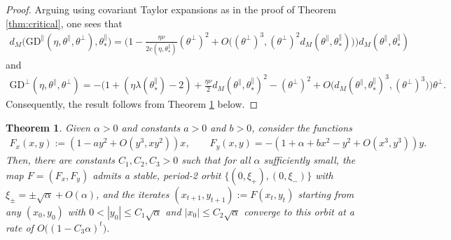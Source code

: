 \documentclass{article}
\newcommand{\tpa}{\theta^{\parallel}}
\newcommand{\tpe}{\theta^{\perp}}
\newcommand{\GD}{\mathrm{GD}}
\theoremstyle{plain}
\newtheorem{theorem}{Theorem}[section]
\theoremstyle{definition}
\theoremstyle{remark}
\begin{document}
\begin{proof}
    Arguing using covariant Taylor expansions as in the proof of Theorem \ref{thm:critical}, one sees that
    \begin{align}
        d_M\big(\GD^{\parallel}(\eta,\tpa,\tpe),\tpa_*\big) = \bigg(1-\frac{\eta \nu}{2c(\eta,\tpa_*)}(\tpe)^2 + O\big((\tpe)^3,(\tpe)^2d_M(\tpa,\tpa_*)\big)\bigg)d_M(\tpa,\tpa_*)
    \end{align}
    and
    \begin{align}
        \GD^{\perp}(\eta,\tpa,\tpe) = -\bigg(1+(\eta\lambda(\tpa_*)-2) + \frac{\eta\nu}{2}d_M(\tpa,\tpa_*)^2 - (\tpe)^2 + O\big(d_M(\tpa,\tpa_*)^3,(\tpe)^3\big)\bigg)\tpe.
    \end{align}
    Consequently, the result follows from Theorem \ref{thm:hyperbolic} below.
\end{proof}

\begin{theorem}\label{thm:hyperbolic}
    Given $\alpha>0$ and constants $a>0$ and $b>0$, consider the functions
    \begin{align}
        F_x(x,y):=(1-ay^2 + O(y^3,xy^2))x,\qquad F_y(x,y) = -(1+\alpha+bx^2-y^2 + O(x^3,y^3))y.
    \end{align}
    Then, there are constants $C_1,C_2,C_3>0$ such that for all $\alpha$ sufficiently small, the map $F = (F_x,F_y)$ admits a stable, period-2 orbit $\{(0,\xi_+),(0,\xi_-)\}$ with $\xi_{\pm} = \pm\sqrt{\alpha}+O(\alpha)$, and the iterates $(x_{t+1},y_{t+1}):=F(x_t,y_t)$ starting from any $(x_0,y_0)$ with $0<|y_0|\leq C_1\sqrt{\alpha}$ and $|x_0|\leq C_2\sqrt{\alpha}$ converge to this orbit at a rate of $O\big((1-C_3\alpha)^t\big)$.
\end{theorem}
\end{document}
